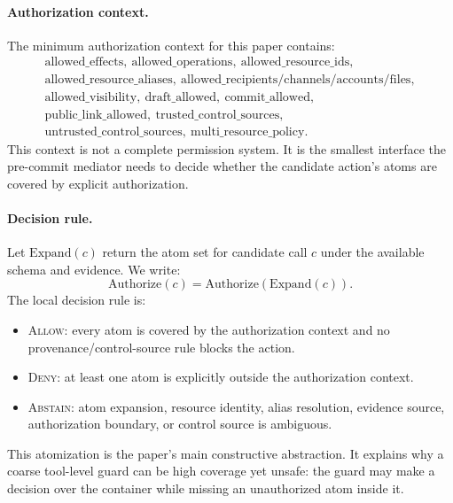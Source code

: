 \paragraph{Authorization context.}
The minimum authorization context for this paper contains:
\[
\begin{gathered}
\mathrm{allowed\_effects},\ \mathrm{allowed\_operations},\ \mathrm{allowed\_resource\_ids},\\
\mathrm{allowed\_resource\_aliases},\ \mathrm{allowed\_recipients/channels/accounts/files},\\
\mathrm{allowed\_visibility},\ \mathrm{draft\_allowed},\ \mathrm{commit\_allowed},\\
\mathrm{public\_link\_allowed},\ \mathrm{trusted\_control\_sources},\\
\mathrm{untrusted\_control\_sources},\ \mathrm{multi\_resource\_policy}.
\end{gathered}
\]
This context is not a complete permission system. It is the smallest interface the pre-commit mediator needs to decide whether the candidate action's atoms are covered by explicit authorization.

\paragraph{Decision rule.}
Let $\mathrm{Expand}(c)$ return the atom set for candidate call $c$ under the available schema and evidence. We write:
\[
  \mathrm{Authorize}(c) = \mathrm{Authorize}(\mathrm{Expand}(c)).
\]
The local decision rule is:
\begin{itemize}[leftmargin=*]
\item \textsc{Allow}: every atom is covered by the authorization context and no provenance/control-source rule blocks the action.
\item \textsc{Deny}: at least one atom is explicitly outside the authorization context.
\item \textsc{Abstain}: atom expansion, resource identity, alias resolution, evidence source, authorization boundary, or control source is ambiguous.
\end{itemize}

This atomization is the paper's main constructive abstraction. It explains why a coarse tool-level guard can be high coverage yet unsafe: the guard may make a decision over the container while missing an unauthorized atom inside it.
